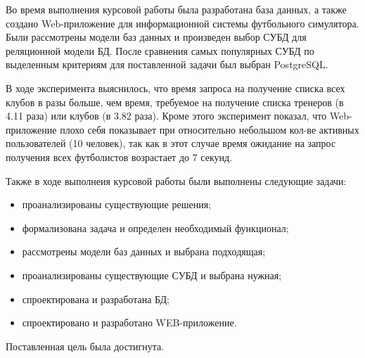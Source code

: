 \conclusion

Во время выполнения курсовой работы была разработана база данных, а также создано Web-приложение для информационной системы футбольного симулятора. Были рассмотрены модели баз данных и произведен выбор СУБД для реляционной модели БД. После сравнения самых популярных СУБД по выделенным критериям для поставленной задачи был выбран PostgreSQL.

В ходе эксперимента выяснилось, что время запроса на получение списка всех клубов в разы больше, чем время, требуемое на получение списка тренеров (в 4.11 раза) или клубов (в 3.82 раза). Кроме этого эксперимент показал, что Web-приложение плохо себя показывает при относительно небольшом кол-ве активных пользователей (10 человек), так как в этот случае время ожидание на запрос получения всех футболистов возрастает до 7 секунд.

Также в ходе выполнеия курсовой работы были выполнены следующие задачи:

\begin{itemize}
	\item проанализированы существующие решения;
	\item формализована задача и определен необходимый функционал;
	\item рассмотрены модели баз данных и выбрана подходящая;
	\item проанализированы существующие СУБД и выбрана нужная;
 	\item спроектирована и разработана БД;
    \item спроектировано и разработано WEB-приложение.
\end{itemize}

Поставленная цель была достигнута.
